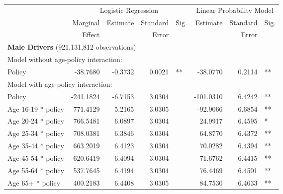 
\begin{table}%
\centering 
\begin{tabular}{l r r r l r r l} 

\hline 
 
 & \multicolumn{4}{c}{Logistic Regression}  & \multicolumn{3}{c}{Linear Probability Model} \\ 

 \cmidrule(lr){2-5}\cmidrule(lr){6-8} 
 & Marginal & Estimate & Standard & Sig. & Estimate & Standard & Sig. \\ 
 &   Effect &          &  Error   &      &          &  Error   &     \\ 

\hline 
 
\multicolumn{7}{l}{\textbf{Male Drivers} (921,131,812 observations)} \\ 

\hline
\multicolumn{7}{l}{Model without age-policy interaction: } \\ 
Policy                   &  -38.7680       &  -0.3732        &  0.0021       &   **       &  -38.0770        &  0.2114       &   **       \\ 
\hline
\multicolumn{7}{l}{Model with age-policy interaction: } \\ 
Policy                   &  -241.1824       &  -6.7153        &  3.0304       &            &  -101.0310        &  6.4242       &   **       \\ 
Age 16-19 * policy   &  771.4129       &  5.2165        &  3.0305       &            &  -92.9066        &  6.6854       &   **       \\ 
Age 20-24 * policy   &  766.5481       &  6.0897        &  3.0304       &            &  24.9917        &  6.4595       &    *       \\ 
Age 25-34 * policy   &  708.0381       &  6.3846        &  3.0304       &            &  64.8770        &  6.4372       &   **       \\ 
Age 35-44 * policy   &  663.2019       &  6.4123        &  3.0304       &            &  70.0282        &  6.4394       &   **       \\ 
Age 45-54 * policy   &  620.6419       &  6.4094        &  3.0304       &            &  71.6762        &  6.4415       &   **       \\ 
Age 55-64 * policy   &  537.7645       &  6.4194        &  3.0304       &            &  76.4469        &  6.4501       &   **       \\ 
Age 65+ * policy   &  400.2183       &  6.4408        &  3.0305       &            &  84.7530        &  6.4633       &   **       \\ 


\end{tabular}
\end{table}
